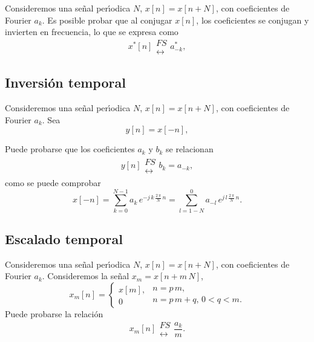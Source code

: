 Consideremos una se\~{n}al per\'{\i}odica $N$, $x\left[ n\right]
=x\left[ n+N\right]$, con coeficientes de Fourier $a_{k}$. 
Es posible probar que al conjugar $x[n]$, los
coeficientes se conjugan y invierten en frecuencia, lo que se expresa como
\begin{equation}
x^{*}\left[ n\right] 
\begin{array}{l}
FS \\ 
\longleftrightarrow
\end{array}
a_{-k}^{*},
\end{equation}

\subsection{Inversi\'{o}n temporal}

Consideremos una se\~{n}al per\'{\i}odica $N$, $x\left[ n\right]
=x\left[ n+N\right]$, con coeficientes de Fourier $a_{k}$. Sea
\begin{equation}
y\left[ n\right] =x\left[ -n\right] ,
\end{equation}

Puede probarse que los coeficientes $a_{k}$ y $b_{k}$ se relacionan
\begin{eqnarray}
y\left[ n\right] 
\begin{array}{l}
FS \\ 
\longleftrightarrow
\end{array}
b_{k}=a_{-k},
\end{eqnarray}
como se puede comprobar
\begin{equation}
x\left[ -n\right] =\sum_{k=0}^{N-1}a_{k} \, e^{-j \, k \, \frac{2 \, \pi }{N} \, n}
=
\sum_{l=1-N}^{0}a_{-l} \, e^{j \, l \, \frac{2 \, \pi }{N}\, n}.
\end{equation}

\subsection{Escalado temporal}

Consideremos una se\~{n}al per\'{\i}odica $N$, $x\left[ n\right]
=x\left[ n+N\right]$, con coeficientes de Fourier
$a_{k}$. Consideremos la se\~{n}al $x_{m} = x[n + m \, N]$,
\begin{equation}
x_{m}\left[ n\right] =\left\{ 
\begin{array}{l}
x\left[ m \right] , \\ 
0
\end{array}
\begin{array}{l}
n=p \, m, \\ 
n=p \, m+q, \, 0 < q < m.
\end{array}
\right.
\end{equation}
Puede probarse la relaci\'{o}n
\begin{equation}
x_{m}\left[ n\right] 
\begin{array}{l}
FS \\ 
\longleftrightarrow
\end{array}
\frac{a_{k}}{m}.
\end{equation}

